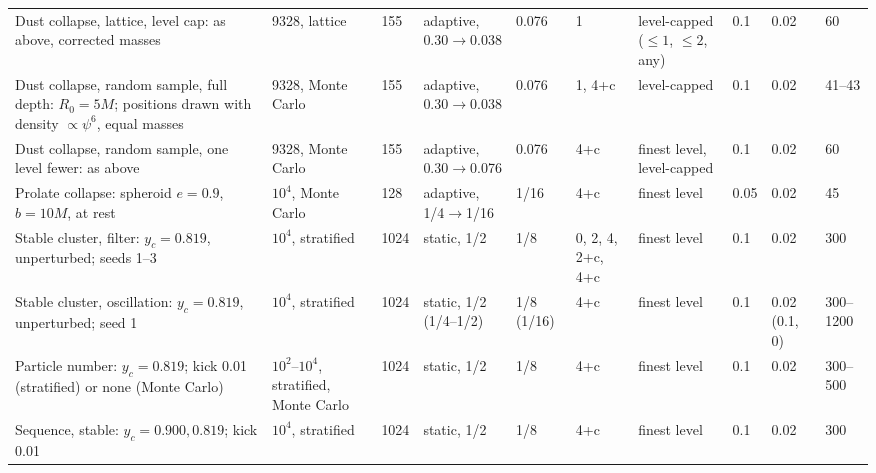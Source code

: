 \begin{table}
\begin{ruledtabular}
\begin{tabular}{p{}p{}p{}p{}p{}p{}p{}p{}p{}p{}}
\raggedright Dust collapse, lattice, level cap: as above, corrected masses & \raggedright 9328, lattice & \raggedright 155 & \raggedright adaptive, 0.30$\to$0.038 & \raggedright 0.076 & \raggedright 1 & \raggedright level-capped ($\le1$, $\le2$, any) & \raggedright 0.1 & \raggedright 0.02 & \raggedright 60 \tabularnewline
\raggedright Dust collapse, random sample, full depth: $R_0=5M$; positions drawn with density $\propto\psi^6$, equal masses\footnotemark[1] & \raggedright 9328, Monte Carlo & \raggedright 155 & \raggedright adaptive, 0.30$\to$0.038 & \raggedright 0.076 & \raggedright 1, 4+c & \raggedright level-capped & \raggedright 0.1 & \raggedright 0.02 & \raggedright 41--43\footnotemark[2] \tabularnewline
\raggedright Dust collapse, random sample, one level fewer: as above & \raggedright 9328, Monte Carlo & \raggedright 155 & \raggedright adaptive, 0.30$\to$0.076 & \raggedright 0.076 & \raggedright 4+c & \raggedright finest level, level-capped & \raggedright 0.1 & \raggedright 0.02 & \raggedright 60 \tabularnewline
\raggedright Prolate collapse: spheroid $e=0.9$, $b=10M$, at rest & \raggedright $10^4$, Monte Carlo & \raggedright 128 & \raggedright adaptive, 1/4$\to$1/16 & \raggedright 1/16 & \raggedright 4+c & \raggedright finest level & \raggedright 0.05 & \raggedright 0.02 & \raggedright 45 \tabularnewline
\raggedright Stable cluster, filter: $y_c=0.819$, unperturbed; seeds 1--3 & \raggedright $10^4$, stratified & \raggedright 1024 & \raggedright static, 1/2 & \raggedright 1/8 & \raggedright 0, 2, 4, 2+c, 4+c & \raggedright finest level & \raggedright 0.1 & \raggedright 0.02 & \raggedright 300 \tabularnewline
\raggedright Stable cluster, oscillation: $y_c=0.819$, unperturbed; seed 1 & \raggedright $10^4$, stratified & \raggedright 1024 & \raggedright static, 1/2 (1/4--1/2) & \raggedright 1/8 (1/16) & \raggedright 4+c\footnotemark[3] & \raggedright finest level & \raggedright 0.1 & \raggedright 0.02 (0.1, 0)\footnotemark[4] & \raggedright 300--1200 \tabularnewline
\raggedright Particle number: $y_c=0.819$; kick 0.01 (stratified) or none (Monte Carlo) & \raggedright $10^2$--$10^4$, stratified, Monte Carlo & \raggedright 1024 & \raggedright static, 1/2 & \raggedright 1/8 & \raggedright 4+c & \raggedright finest level & \raggedright 0.1 & \raggedright 0.02 & \raggedright 300--500 \tabularnewline
\raggedright Sequence, stable: $y_c=0.900, 0.819$; kick 0.01 & \raggedright $10^4$, stratified & \raggedright 1024 & \raggedright static, 1/2 & \raggedright 1/8 & \raggedright 4+c & \raggedright finest level & \raggedright 0.1 & \raggedright 0.02 & \raggedright 300 \tabularnewline

\end{tabular}
\end{ruledtabular}
\end{table}
